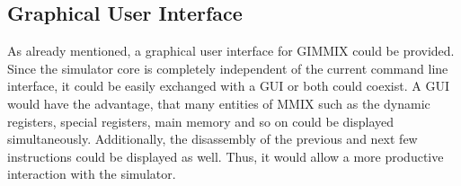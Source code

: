 \subsection{Graphical User Interface}

As already mentioned, a graphical user interface for GIMMIX could be provided. Since the simulator core is completely independent of the current command line interface, it could be easily exchanged with a GUI or both could coexist. A GUI would have the advantage, that many entities of MMIX such as the dynamic registers, special registers, main memory and so on could be displayed simultaneously. Additionally, the disassembly of the previous and next few instructions could be displayed as well. Thus, it would allow a more productive interaction with the simulator.


